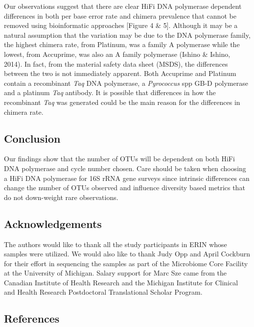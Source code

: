 \documentclass[12pt,]{article}
\begin{document}
Our observations suggest that there are clear HiFi DNA polymerase
dependent differences in both per base error rate and chimera prevalence
that cannot be removed using bioinformatic approaches {[}Figure 4 \&
5{]}. Although it may be a natural assumption that the variation may be
due to the DNA polymerase family, the highest chimera rate, from
Platinum, was a family A polymerase while the lowest, from Accuprime,
was also an A family polymerase (Ishino \& Ishino, 2014). In fact, from
the material safety data sheet (MSDS), the differences between the two
is not immediately apparent. Both Accuprime and Platinum contain a
recombinant \emph{Taq} DNA polymerase, a \emph{Pyrococcus} spp GB-D
polymerase and a platinum \emph{Taq} antibody. It is possible that
differences in how the recombinant \emph{Taq} was generated could be the
main reason for the differences in chimera rate.

\newpage

\subsection{Conclusion}\label{conclusion}

Our findings show that the number of OTUs will be dependent on both HiFi
DNA polymerase and cycle number chosen. Care should be taken when
choosing a HiFi DNA polymerase for 16S rRNA gene surveys since intrinsic
differences can change the number of OTUs observed and influence
diversity based metrics that do not down-weight rare observations.

\newpage

\subsection{Acknowledgements}\label{acknowledgements}

The authors would like to thank all the study participants in ERIN whose
samples were utilized. We would also like to thank Judy Opp and April
Cockburn for their effort in sequencing the samples as part of the
Microbiome Core Facility at the University of Michigan. Salary support
for Marc Sze came from the Canadian Institute of Health Research and the
Michigan Institute for Clinical and Health Research Postdoctoral
Translational Scholar Program.

\newpage

\subsection{References}\label{references}
\end{document}
